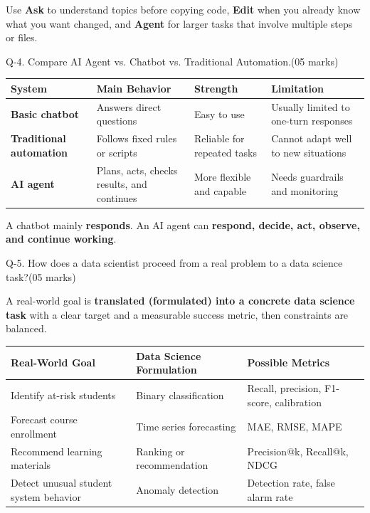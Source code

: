 \documentclass[11pt,a4paper]{article}
\newcommand{\question}[2]{%
  \begin{qbox}#1\hfill\textcolor{accent}{(05 marks)}\\[2pt]#2\end{qbox}%
}
\begin{document}
\begin{conceptbox}
Use \textbf{Ask} to understand topics before copying code, \textbf{Edit} when you already know what you want changed, and \textbf{Agent} for larger tasks that involve multiple steps or files.
\end{conceptbox}

\question{Q-4. Compare AI Agent vs. Chatbot vs. Traditional Automation.}{}

\begin{center}
\begin{tabular}{@{}>{\bfseries}p{3.0cm}p{3.6cm}p{3.4cm}p{3.4cm}@{}}
\toprule
\rowcolor{primary!15}
\textbf{System} & \textbf{Main Behavior} & \textbf{Strength} & \textbf{Limitation} \\
\midrule
Basic chatbot & Answers direct questions & Easy to use & Usually limited to one-turn responses \\
Traditional automation & Follows fixed rules or scripts & Reliable for repeated tasks & Cannot adapt well to new situations \\
AI agent & Plans, acts, checks results, and continues & More flexible and capable & Needs guardrails and monitoring \\
\bottomrule
\end{tabular}
\end{center}

\begin{conceptbox}
A chatbot mainly \textbf{responds}. An AI agent can \textbf{respond, decide, act, observe, and continue working}.
\end{conceptbox}

\question{Q-5. How does a data scientist proceed from a real problem to a data science task?}{}

A real-world goal is \textbf{translated (formulated) into a concrete data science task} with a clear target and a measurable success metric, then constraints are balanced.

\begin{center}
\begin{tabular}{@{}p{4.0cm}p{4.0cm}p{5.0cm}@{}}
\toprule
\rowcolor{primary!15}
\textbf{Real-World Goal} & \textbf{Data Science Formulation} & \textbf{Possible Metrics} \\
\midrule
Identify at-risk students & Binary classification & Recall, precision, F1-score, calibration \\
Forecast course enrollment & Time series forecasting & MAE, RMSE, MAPE \\
Recommend learning materials & Ranking or recommendation & Precision@k, Recall@k, NDCG \\
Detect unusual student system behavior & Anomaly detection & Detection rate, false alarm rate \\
\bottomrule
\end{tabular}
\end{center}
\end{document}
